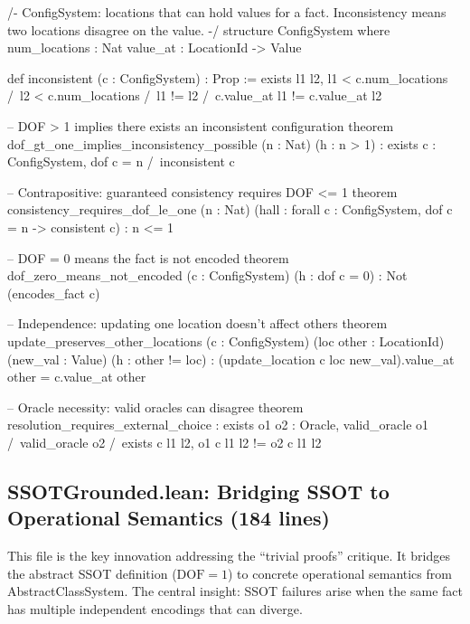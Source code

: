 \begin{code}
/-
  ConfigSystem: locations that can hold values for a fact.
  Inconsistency means two locations disagree on the value.
-/
structure ConfigSystem where
  num_locations : Nat
  value_at : LocationId -> Value

def inconsistent (c : ConfigSystem) : Prop :=
  exists l1 l2, l1 < c.num_locations /\
                l2 < c.num_locations /\
                l1 != l2 /\
                c.value_at l1 != c.value_at l2

-- DOF > 1 implies there exists an inconsistent configuration
theorem dof_gt_one_implies_inconsistency_possible (n : Nat) (h : n > 1) :
    exists c : ConfigSystem, dof c = n /\
    inconsistent c

-- Contrapositive: guaranteed consistency requires DOF <= 1
theorem consistency_requires_dof_le_one (n : Nat)
    (hall : forall c : ConfigSystem, dof c = n -> consistent c) : n <= 1

-- DOF = 0 means the fact is not encoded
theorem dof_zero_means_not_encoded (c : ConfigSystem) (h : dof c = 0) :
    Not (encodes_fact c)

-- Independence: updating one location doesn't affect others
theorem update_preserves_other_locations (c : ConfigSystem) (loc other : LocationId)
    (new_val : Value) (h : other != loc) :
    (update_location c loc new_val).value_at other = c.value_at other

-- Oracle necessity: valid oracles can disagree
theorem resolution_requires_external_choice :
    exists o1 o2 : Oracle, valid_oracle o1 /\
    valid_oracle o2 /\
    exists c l1 l2, o1 c l1 l2 != o2 c l1 l2
\end{code}

\subsection{SSOTGrounded.lean: Bridging SSOT to Operational Semantics (184 lines)}\label{sec:lean-grounded}

This file is the key innovation addressing the ``trivial proofs'' critique. It bridges the abstract SSOT definition ($\text{DOF} = 1$) to concrete operational semantics from AbstractClassSystem. The central insight: SSOT failures arise when the same fact has multiple independent encodings that can diverge.

